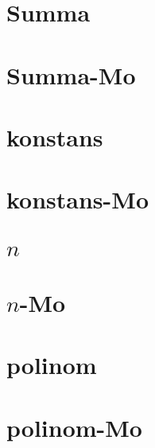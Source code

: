 \begin{spacing}{1.2}
         \section*{Summa} \label{nthrootSum}
         \Fa{
            
         }
         \newpage
         \section*{Summa-Mo} \label{nthrootSumMo}
         \Mo{
            
         }
         \newpage
         \section*{konstans} \label{nthroot1}
         \Fa{
            
         }
         \newpage
         \section*{konstans-Mo} \label{nthroot1Mo}
         \Mo{
            
         }
         \newpage
         \section*{$n$} \label{nthroot2}
         \Fa{
            
         }
         \newpage
         \section*{$n$-Mo} \label{nthroot2Mo}
         \Mo{
            
         }
         \newpage
         \section*{polinom} \label{nthroot2a}
         \Fa{
            
         }
         \newpage
         \section*{polinom-Mo} \label{nthroot2aMo}
         \Mo{
            
         }
         \newpage

\end{spacing}

